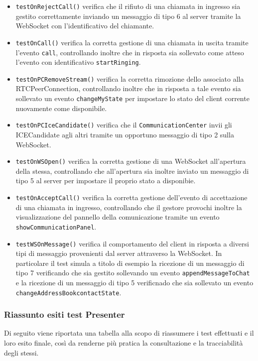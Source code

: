 \begin{itemize}
\begin{itemize}
\item \texttt{testOnRejectCall()} verifica che il rifiuto di una chiamata in ingresso sia gestito correttamente inviando un messaggio di tipo 6 al server tramite la WebSocket con l'identificativo del chiamante.

\item \texttt{testOnCall()} verifica la corretta gestione di una chiamata in uscita tramite l'evento \verb'call', controllando inoltre che in risposta sia sollevato come atteso l'evento con identificativo \verb'startRinging'.

\item \texttt{testOnPCRemoveStream()} verifica la corretta rimozione dello  associato alla RTCPeerConnection, controllando inoltre che in risposta a tale evento sia sollevato un evento \verb'changeMyState' per impostare lo stato del client corrente nuovamente come disponibile.

\item \texttt{testOnPCIceCandidate()} verifica che il \texttt{CommunicationCenter} invii gli ICECandidate agli altri  tramite un opportuno messaggio di tipo 2 sulla WebSocket.

\item \texttt{testOnWSOpen()} verifica la corretta gestione di una WebSocket all'apertura della stessa, controllando che all'apertura sia inoltre inviato un messaggio di tipo 5 al server per impostare il proprio stato a disponibie.

\item \texttt{testOnAcceptCall()} verifica la corretta gestione dell'evento di accettazione di una chiamata in ingresso, controllando che il gestore provochi inoltre la visualizzazione  del pannello della comunicazione tramite un evento \verb'showCommunicationPanel'.

\item \texttt{testWSOnMessage()} verifica il comportamento del client in risposta a diversi tipi di messaggio provenienti dal server attraverso la WebSocket. In particolare il test simula a titolo di esempio la ricezione di un messaggio di tipo 7 verificando che sia gestito sollevando un evento \verb'appendMessageToChat' e la ricezione di un messaggio di tipo 5 verificnado che sia sollevato un evento \verb'changeAddressBookcontactState'.
\end{itemize}


\end{itemize}

\subsubsection{Riassunto esiti test Presenter}
Di seguito viene riportata una tabella alla scopo di riassumere i test effettuati e il loro esito finale, così da renderne più pratica la consultazione e la tracciabilità degli stessi.

